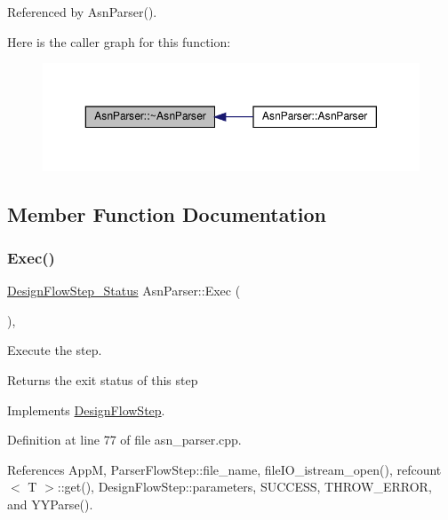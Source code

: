 Referenced by Asn\+Parser().

Here is the caller graph for this function\+:
\nopagebreak
\begin{figure}[H]
\begin{center}
\leavevmode
\includegraphics[width=350pt]{d7/dcb/classAsnParser_a3acc427d2affbbabd19109dce2463464_icgraph}
\end{center}
\end{figure}


\subsection{Member Function Documentation}
\mbox{\label{classAsnParser_abdbeaeae6fefdb8081b3705d0a081d6f}} 
\subsubsection{\texorpdfstring{Exec()}{Exec()}}
{\footnotesize\ttfamily \hyperlink{design__flow__step_8hpp_afb1f0d73069c26076b8d31dbc8ebecdf}{Design\+Flow\+Step\+\_\+\+Status} Asn\+Parser\+::\+Exec (\begin{DoxyParamCaption}{ }\end{DoxyParamCaption})\hspace{0.3cm}{\ttfamily [override]}, {\ttfamily [virtual]}}



Execute the step. 

\begin{DoxyReturn}{Returns}
the exit status of this step 
\end{DoxyReturn}


Implements \hyperlink{classDesignFlowStep_a77d7e38493016766098711ea24f60b89}{Design\+Flow\+Step}.



Definition at line 77 of file asn\+\_\+parser.\+cpp.



References AppM, Parser\+Flow\+Step\+::file\+\_\+name, file\+I\+O\+\_\+istream\+\_\+open(), refcount$<$ T $>$\+::get(), Design\+Flow\+Step\+::parameters, S\+U\+C\+C\+E\+SS, T\+H\+R\+O\+W\+\_\+\+E\+R\+R\+OR, and Y\+Y\+Parse().

